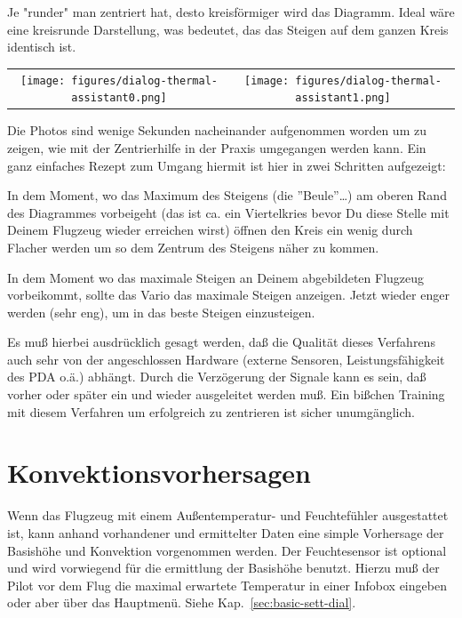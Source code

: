 Je "runder" man zentriert hat, desto kreisförmiger wird das Diagramm. Ideal wäre eine kreisrunde
Darstellung, was bedeutet, das das Steigen auf dem ganzen Kreis identisch ist.

\begin{tabular}{c c}
\texttt{[image: figures/dialog-thermal-assistant0.png]}&
\texttt{[image: figures/dialog-thermal-assistant1.png]}\\
\end{tabular}

Die Photos sind wenige Sekunden nacheinander aufgenommen worden um zu zeigen, wie mit der Zentrierhilfe
in  der Praxis umgegangen  werden kann. Ein ganz einfaches Rezept zum Umgang hiermit ist hier in zwei Schritten aufgezeigt:

\begin{description}
\item[1.]  In dem Moment, wo das Maximum des Steigens  (die ''Beule''\dots) am  oberen Rand des Diagrammes  vorbeigeht
(das ist ca. ein Viertelkries bevor Du diese Stelle mit Deinem Flugzeug wieder erreichen wirst) öffnen den
Kreis ein wenig durch Flacher werden um so dem Zentrum des Steigens näher zu kommen.
\item[2.]  In dem Moment wo das maximale Steigen an Deinem abgebildeten Flugzeug vorbeikommt,
sollte das Vario das maximale Steigen anzeigen. Jetzt wieder enger werden (sehr eng), um in das
beste Steigen einzusteigen.
\end{description}

Es muß hierbei ausdrücklich gesagt werden, daß die Qualität dieses Verfahrens auch sehr von der
angeschlossen
Hardware (externe Sensoren,  Leistungsfähigkeit des PDA o.ä.) abhängt. Durch die Verzögerung der
Signale kann es sein, daß vorher oder später ein und wieder ausgeleitet werden muß.
Ein bißchen Training mit diesem Verfahren um  erfolgreich zu zentrieren ist sicher unumgänglich.
\section{Konvektionsvorhersagen}\label{sec:convection-forecast}
Wenn das Flugzeug mit einem Außentemperatur- und Feuchtefühler ausgestattet ist, kann anhand
vorhandener und ermittelter Daten  eine simple Vorhersage der Basishöhe und Konvektion
vorgenommen werden. Der Feuchtesensor ist optional und wird vorwiegend für die ermittlung der Basishöhe benutzt.
Hierzu muß der Pilot vor dem Flug die maximal erwartete Temperatur in einer Infobox eingeben
 oder aber über das Hauptmenü. Siehe Kap.~\ref{sec:basic-sett-dial}.

